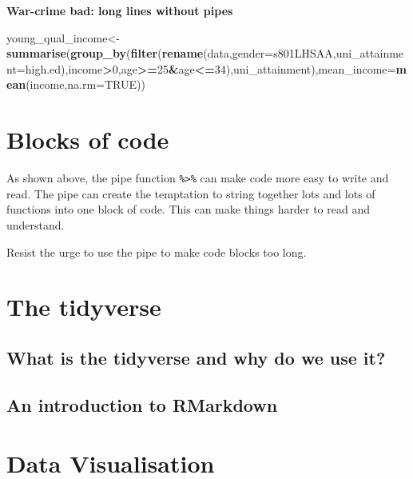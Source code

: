 \documentclass[]{book}
\newenvironment{Shaded}{\begin{snugshade}}{\end{snugshade}}
\newcommand{\DataTypeTok}[1]{\textcolor[rgb]{0.13,0.29,0.53}{#1}}
\newcommand{\DecValTok}[1]{\textcolor[rgb]{0.00,0.00,0.81}{#1}}
\newcommand{\KeywordTok}[1]{\textcolor[rgb]{0.13,0.29,0.53}{\textbf{#1}}}
\newcommand{\NormalTok}[1]{#1}
\newcommand{\OperatorTok}[1]{\textcolor[rgb]{0.81,0.36,0.00}{\textbf{#1}}}
\newcommand{\OtherTok}[1]{\textcolor[rgb]{0.56,0.35,0.01}{#1}}
\begin{document}
\textbf{War-crime bad: long lines without pipes}

\begin{Shaded}
\begin{Highlighting}[]
\NormalTok{young_qual_income<-}\KeywordTok{summarise}\NormalTok{(}\KeywordTok{group_by}\NormalTok{(}\KeywordTok{filter}\NormalTok{(}\KeywordTok{rename}\NormalTok{(data,}\DataTypeTok{gender=}\NormalTok{s801LHSAA,}\DataTypeTok{uni_attainment=}\NormalTok{high.ed),income}\OperatorTok{>}\DecValTok{0}\NormalTok{,age}\OperatorTok{>=}\DecValTok{25}\OperatorTok{&}\NormalTok{age}\OperatorTok{<=}\DecValTok{34}\NormalTok{),uni_attainment),}\DataTypeTok{mean_income=}\KeywordTok{mean}\NormalTok{(income,}\DataTypeTok{na.rm=}\OtherTok{TRUE}\NormalTok{))}
\end{Highlighting}
\end{Shaded}

\hypertarget{blocks-of-code}{%
\chapter{Blocks of code}\label{blocks-of-code}}

As shown above, the pipe function \texttt{\%\textgreater{}\%} can make code more easy to write and read. The pipe can create the temptation to string together lots and lots of functions into one block of code. This can make things harder to read and understand.

Resist the urge to use the pipe to make code blocks too long.

\hypertarget{the-tidyverse}{%
\chapter{The tidyverse}\label{the-tidyverse}}

\hypertarget{what-is-the-tidyverse-and-why-do-we-use-it}{%
\section{What is the tidyverse and why do we use it?}\label{what-is-the-tidyverse-and-why-do-we-use-it}}

\hypertarget{an-introduction-to-rmarkdown}{%
\section{An introduction to RMarkdown}\label{an-introduction-to-rmarkdown}}

\hypertarget{data-visualisation}{%
\chapter{Data Visualisation}\label{data-visualisation}}
\end{document}
